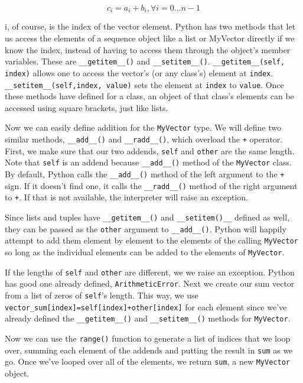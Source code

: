 \begin{displaymath}
c_i = a_i+b_i, \forall i=0...n-1
\end{displaymath}

i, of course, is the index of the vector element. Python has two methods that let us access the elements of a sequence object like a list or MyVector directly if we know the index, instead of having to access them through the object's member variables. These are \verb|__getitem__()| and \verb|__setitem__()|. \verb|__getitem__(self, index)| allows one to access the vector's (or any class's) element at \verb|index|. \verb|__setitem__(self,index, value)| sets the element at \verb|index| to \verb|value|.  Once these methods have defined for a class, an object of that class's elements can be accessed using square brackets, just like lists.

Now we can easily define addition for the \verb|MyVector| type. We will define two similar methods, \verb|__add__()| and \verb|__radd__()|, which overload the \verb|+| operator. First, we make sure that our two addends, \verb|self| and \verb|other| are the same length. Note that \verb|self| is an addend because \verb|__add__()| method of the \verb|MyVector| class. By default, Python calls the \verb|__add__()| method of the left argument to the \verb|+| sign. If it doesn't find one, it calls the \verb|__radd__()| method of the right argument to \verb|+|. If that is not available, the interpreter will raise an exception.

Since lists and tuples have \verb|__getitem__()| and \verb|__setitem()__| defined as well, they  can be passed as the \verb|other| argument to \verb|__add__()|. Python will happily attempt to add them element by element to the elements of the calling \verb|MyVector| so long as the individual elements can be added to the elements of \verb|MyVector|.

If the lengths of \verb|self| and \verb|other| are different, we we raise an exception. Python has good one already defined, \verb|ArithmeticError|. Next we create our sum vector from a list of zeros of \verb|self|'s length. This way, we use \verb|vector_sum[index]=self[index]+other[index]| for each element since we've already defined the \verb|__getitem__()| and \verb|__setitem__()| methods for \verb|MyVector|.

Now we can use the \verb|range()| function to generate a list of indices that we loop over, summing each element of the addends and putting the result in \verb|sum| as we go. Once we've looped over all of the elements, we return \verb|sum|, a new \verb|MyVector| object.


